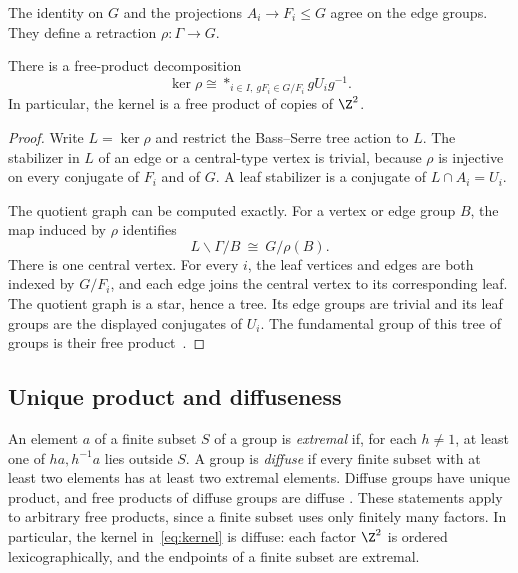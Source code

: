 The identity on \(G\) and the projections \(A_i\to F_i\le G\)
agree on the edge groups. They define a retraction
\(\rho:\Gamma\to G\).

\begin{lemma}\label{lem:kernel}
There is a free-product decomposition
\begin{equation}\label{eq:kernel}
 \ker\rho\cong
 *_{i\in I,\ gF_i\in G/F_i}gU_i g^{-1}.
\end{equation}
In particular, the kernel is a free product of copies of \(\Z^2\).
\end{lemma}

\begin{proof}
Write \(L=\ker\rho\) and restrict the Bass--Serre tree action to \(L\).
The stabilizer in \(L\) of an edge or a central-type vertex is trivial,
because \(\rho\) is injective on every conjugate of \(F_i\) and of \(G\).
A leaf stabilizer is a conjugate of
\(L\cap A_i=U_i\).

The quotient graph can be computed exactly. For a vertex or edge group
\(B\), the map induced by \(\rho\) identifies
\[
 L\backslash\Gamma/B\ \cong\ G/\rho(B).
\]
There is one central vertex. For every \(i\), the leaf vertices and
edges are both indexed by \(G/F_i\), and each edge joins the central
vertex to its corresponding leaf. The quotient graph is a star, hence
a tree. Its edge groups are trivial and its leaf groups are the
displayed conjugates of \(U_i\). The fundamental group of this tree of
groups is their free product~\cite[Theorem~13 in I.5.4]{SerreTrees}.
\end{proof}

\subsection{Unique product and diffuseness}\label{sec:diffuse}

An element \(a\) of a finite subset \(S\) of a group is \emph{extremal}
if, for each \(h\ne1\), at least one of \(ha,h^{-1}a\) lies outside \(S\).
A group is \emph{diffuse} if every finite subset with at least two
elements has at least two extremal elements. Diffuse groups have unique
product, and free products of diffuse groups are diffuse
\cite[Proposition~1.1 and Theorem~1.2(2)]{Bowditch}.
These statements apply to arbitrary free products, since a finite
subset uses only finitely many factors. In particular, the kernel
in~\eqref{eq:kernel} is diffuse: each factor \(\Z^2\) is ordered
lexicographically, and the endpoints of a finite subset are extremal.


